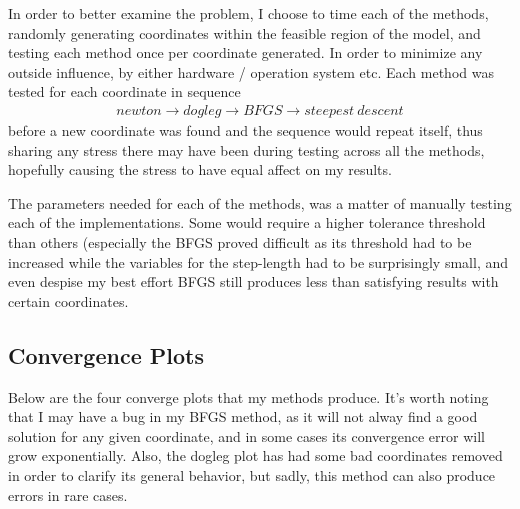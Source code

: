 \documentclass[11pt]{article} %
\begin{document}
In order to better examine the problem, I choose to time each of the methods, randomly generating coordinates within the feasible region of the model, and testing each method once per coordinate generated. In order to minimize any outside influence, by either hardware / operation system etc. Each method was tested for each coordinate in sequence
\begin{gather*}
newton \rightarrow dogleg \rightarrow BFGS \rightarrow steepest~descent
\end{gather*}
before a new coordinate was found and the  sequence would repeat itself, thus sharing any stress there may have been during testing across all the methods, hopefully causing the stress to have equal affect on my results.

The parameters needed for each of the methods, was a matter of manually testing each of the implementations. Some would require a higher tolerance threshold than others (especially the BFGS proved difficult as its threshold had to be increased while the variables for the step-length had to be surprisingly small, and even despise my best effort BFGS still produces less than satisfying results with certain coordinates.

\subsection*{Convergence Plots}
Below are the four converge plots that my methods produce. It's worth noting that I may have a bug in my BFGS method, as it will not alway find a good solution for any given coordinate, and in some cases its convergence error will grow exponentially. Also, the dogleg plot has had some bad coordinates removed in order to clarify its general behavior, but sadly, this method can also produce errors in rare cases.
\end{document}
